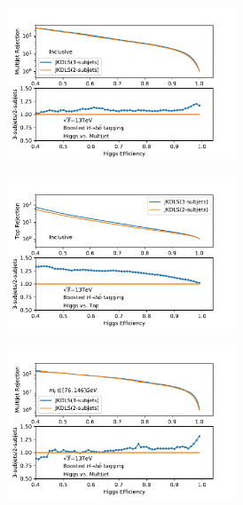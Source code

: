 \begin{figure}[htbp]
  \begin{subfigure}{.5\textwidth}
  \centering
   \includegraphics[width=0.75\textwidth]{figuresXbb/Subjet/SUBQCD.pdf}
   \caption{}
   \label{fig:}
  \end{subfigure}
  \begin{subfigure}{.5\textwidth}
  \centering
   \includegraphics[width=0.75\textwidth]{figuresXbb/Subjet/SUBTop.pdf}
     \caption{}
   \label{fig:}
  \end{subfigure}
\newline 
   \begin{subfigure}{.5\textwidth}
  \centering
   \includegraphics[width=0.75\textwidth]{figuresXbb/Subjet/SUBQCDMASS.pdf}

\end{subfigure}
\end{figure}

